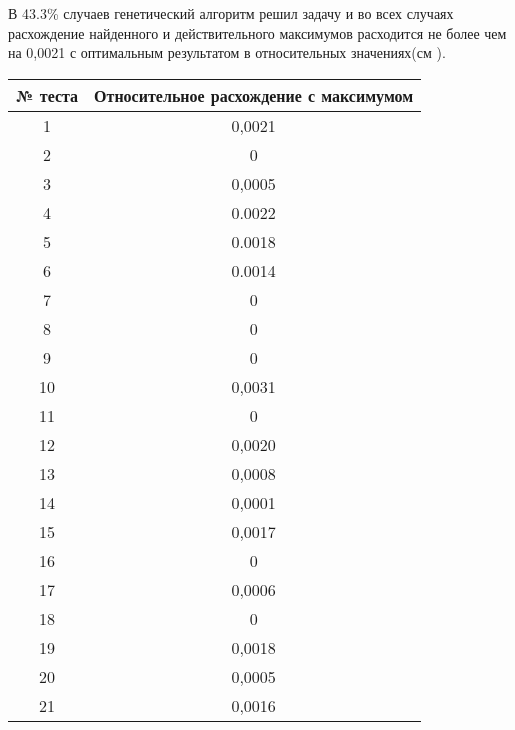 \FloatBarrier
В 43.3\% случаев генетический алгоритм решил задачу и во всех случаях расхождение найденного и действительного максимумов расходится не более чем на 0,0021 с оптимальным результатом в относительных значениях(см \cite{BigResults2}). 
\begin{table}[ht!]
	\centering
	\begin{tabular}{|c|c|}
		\hline
		№ теста & Относительное расхождение с максимумом \\ \hline
		1       & 0,0021                                 \\ \hline
		2       & 0                                      \\ \hline
		3       & 0,0005                                 \\ \hline
		4       & 0.0022                                 \\ \hline
		5       & 0.0018                                 \\ \hline
		6       & 0.0014                                 \\ \hline
		7       & 0                                      \\ \hline
		8       & 0                                      \\ \hline
		9       & 0                                      \\ \hline
		10      & 0,0031                                 \\ \hline
		11      & 0                                      \\ \hline
		12      & 0,0020                                 \\ \hline
		13      & 0,0008                                 \\ \hline
		14      & 0,0001                                 \\ \hline
		15      & 0,0017                                 \\ \hline
		16      & 0                                      \\ \hline
		17      & 0,0006                                 \\ \hline
		18      & 0                                      \\ \hline
		19      & 0,0018                                 \\ \hline
		20      & 0,0005                                 \\ \hline
		21      & 0,0016                                 \\ \hline

\end{tabular}
\end{table}
